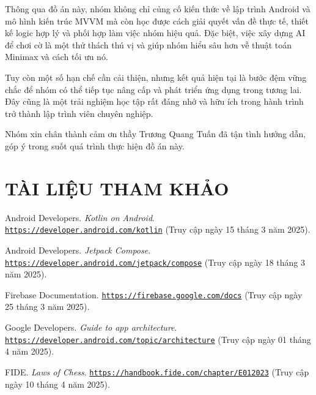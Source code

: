 \documentclass[a4paper,12pt]{article}
\begin{document}
\noindent Thông qua đồ án này, nhóm không chỉ củng cố kiến thức về lập trình Android và mô hình kiến trúc MVVM mà còn học được cách giải quyết vấn đề thực tế, thiết kế logic hợp lý và phối hợp làm việc nhóm hiệu quả. Đặc biệt, việc xây dựng AI để chơi cờ là một thử thách thú vị và giúp nhóm hiểu sâu hơn về thuật toán Minimax và cách tối ưu nó.

\noindent Tuy còn một số hạn chế cần cải thiện, nhưng kết quả hiện tại là bước đệm vững chắc để nhóm có thể tiếp tục nâng cấp và phát triển ứng dụng trong tương lai. Đây cũng là một trải nghiệm học tập rất đáng nhớ và hữu ích trong hành trình trở thành lập trình viên chuyên nghiệp.

\noindent Nhóm xin chân thành cảm ơn thầy Trương Quang Tuấn đã tận tình hướng dẫn, góp ý trong suốt quá trình thực hiện đồ án này.

\newpage %

\section*{\centering \textbf{TÀI LIỆU THAM KHẢO}} %


\begin{thebibliography}{99} %

    Android Developers. \textit{Kotlin on Android}.
    \href{https://developer.android.com/kotlin}{\nolinkurl{https://developer.android.com/kotlin}}
    (Truy cập ngày 15 tháng 3 năm 2025).

    Android Developers. \textit{Jetpack Compose}.
    \href{https://developer.android.com/jetpack/compose}{\nolinkurl{https://developer.android.com/jetpack/compose}}
    (Truy cập ngày 18 tháng 3 năm 2025).

    Firebase Documentation.
    \href{https://firebase.google.com/docs}{\nolinkurl{https://firebase.google.com/docs}}
    (Truy cập ngày 25 tháng 3 năm 2025).

    Google Developers. \textit{Guide to app architecture}.
    \href{https://developer.android.com/topic/architecture}{\nolinkurl{https://developer.android.com/topic/architecture}}
    (Truy cập ngày 01 tháng 4 năm 2025).

    FIDE. \textit{Laws of Chess}.
    \href{https://handbook.fide.com/chapter/E012023}{\nolinkurl{https://handbook.fide.com/chapter/E012023}}
    (Truy cập ngày 10 tháng 4 năm 2025).


\end{thebibliography}
\end{document}
